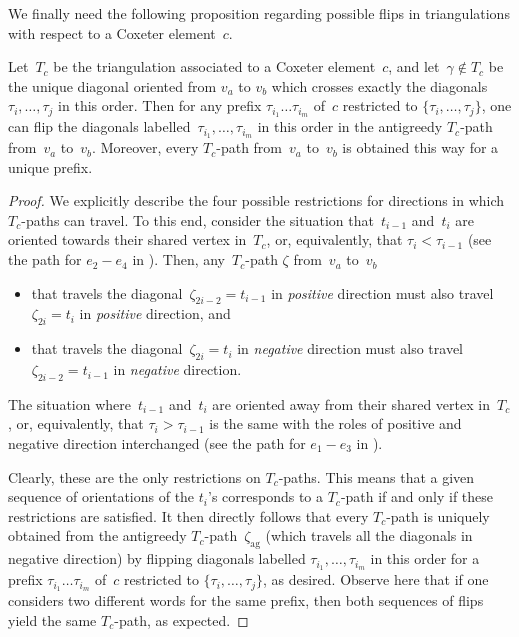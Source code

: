 \documentclass[ALCO,Unicode,ThmDefs]{cedram}
\newcommand{\zetaag}{{\zeta_{\operatorname{ag}}}}
\begin{document}
We finally need the following proposition regarding possible flips in triangulations with respect to a Coxeter element~$c$.

\begin{prop}\label{prop:greedytpath}
Let~$T_c$ be the triangulation associated to a Coxeter element~$c$, and let~$\gamma\notin T_c$ be the unique diagonal oriented from $v_a$ to $v_b$ which crosses exactly the diagonals $\tau_i,\dots,\tau_j$ in this order. Then for any prefix $\tau_{i_1} \dots \tau_{i_m}$ of~$c$ restricted to $\{\tau_i,\dots,\tau_{j}\}$, one can flip the diagonals labelled~$\tau_{i_1},\dots,\tau_{i_m}$ in this order in the antigreedy $T_c$-path from~$v_a$ to~$v_b$. Moreover, every $T_c$-path from~$v_a$ to~$v_b$ is obtained this way for a unique prefix.
\end{prop}

\begin{proof}
We explicitly describe the four possible restrictions for directions in which $T_c$-paths can travel. To this end, consider the situation that~$t_{i-1}$ and~$t_{i}$ are oriented towards their shared vertex in~$T_c$, or, equivalently, that $\tau_{i} < \tau_{i-1}$ (see the path for $e_2-e_4$ in ). Then, any~$T_c$-path $\zeta$ from~$v_a$ to~$v_b$
\begin{itemize}
\item that travels the diagonal~$\zeta_{2i-2} = t_{i-1}$ in \emph{positive} direction must also travel $\zeta_{2i} = t_{i}$ in \emph{positive} direction, and
\item that travels the diagonal~$\zeta_{2i} = t_i$ in \emph{negative} direction must also travel $\zeta_{2i-2} = t_{i-1}$ in \emph{negative} direction.
\end{itemize} The situation where~$t_{i-1}$ and~$t_{i}$ are oriented away from their shared vertex in~$T_c$, or, equivalently, that $\tau_i > \tau_{i-1}$ is the same with the roles of positive and negative direction interchanged (see the path for $e_1-e_3$ in ).

Clearly, these are the only restrictions on $T_c$-paths. This means that a given sequence of orientations of the $t_i$'s corresponds to a $T_c$-path if and only if these restrictions are satisfied. It then directly follows that every $T_c$-path is uniquely obtained from the antigreedy $T_c$-path~$\zetaag$ (which travels all the diagonals in negative direction) by flipping diagonals labelled $\tau_{i_1},\dots,\tau_{i_m}$ in this order for a prefix $\tau_{i_1} \dots \tau_{i_m}$ of~$c$ restricted to $\{\tau_i,\dots,\tau_{j}\}$, as desired. Observe here that if one considers two different words for the same prefix, then both sequences of flips yield the same $T_c$-path, as expected.
\end{proof}
\end{document}
